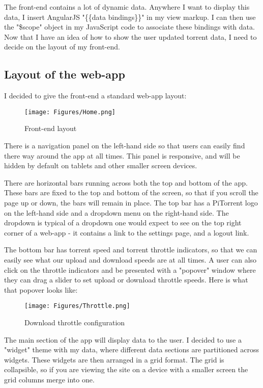 The front-end contains a lot of dynamic data. Anywhere I want to display this data, I insert AngularJS "\{\{data bindings\}\}" in my view markup. I can then use the "\$scope" object in my JavaScript code to associate these bindings with data. Now that I have an idea of how to show the user updated torrent data, I need to decide on the layout of my front-end.

\subsection{Layout of the web-app}
I decided to give the front-end a standard web-app layout:

\vspace{10px}
\begin{figure}[h!]
  \centering
    \texttt{[image: Figures/Home.png]}
  \caption{Front-end layout}
\end{figure}

There is a navigation panel on the left-hand side so that users can easily find there way around the app at all times. This panel is responsive, and will be hidden by default on tablets and other smaller screen devices. 

There are horizontal bars running across both the top and bottom of the app. These bars are fixed to the top and bottom of the screen, so that if you scroll the page up or down, the bars will remain in place. The top bar has a PiTorrent logo on the left-hand side and a dropdown menu on the right-hand side. The dropdown is typical of a dropdown one would expect to see on the top right corner of a web-app - it contains a link to the settings page, and a logout link. 

The bottom bar has torrent speed and torrent throttle indicators, so that we can easily see what our upload and download speeds are at all times. A user can also click on the throttle indicators and be presented with a "popover" window where they can drag a slider to set upload or download throttle speeds. Here is what that popover looks like:

\vspace{10px}
\begin{figure}[h!]
  \centering
    \texttt{[image: Figures/Throttle.png]}
  \caption{Download throttle configuration}
\end{figure}

The main section of the app will display data to the user. I decided to use a "widget" theme with my data, where different data sections are partitioned across widgets. These widgets are then arranged in a grid format. The grid is collapsible, so if you are viewing the site on a device with a smaller screen the grid columns merge into one. 

